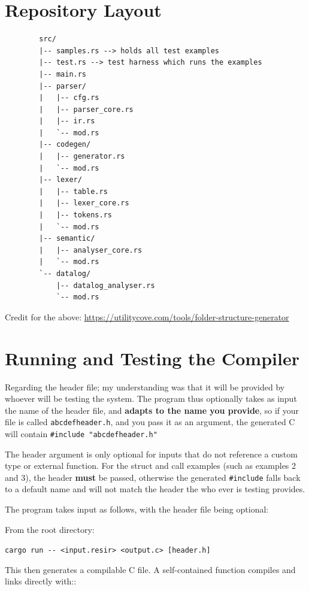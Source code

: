 \documentclass[11pt,a4paper,oneside]{report}
\begin{document}
	
	\section{Repository Layout}
	\begin{lstlisting}
		src/
		|-- samples.rs --> holds all test examples
		|-- test.rs --> test harness which runs the examples 
		|-- main.rs 
		|-- parser/
		|   |-- cfg.rs
		|   |-- parser_core.rs
		|   |-- ir.rs
		|   `-- mod.rs
		|-- codegen/
		|   |-- generator.rs
		|   `-- mod.rs
		|-- lexer/
		|   |-- table.rs
		|   |-- lexer_core.rs
		|   |-- tokens.rs
		|   `-- mod.rs
		|-- semantic/
		|   |-- analyser_core.rs
		|   `-- mod.rs
		`-- datalog/
			|-- datalog_analyser.rs
			`-- mod.rs
	\end{lstlisting}
	
	Credit for the above: \url{https://utilitycove.com/tools/folder-structure-generator}
	
	\section{Running and Testing the Compiler}
	\begin{designbox}
		Regarding the header file; my understanding was that it will be provided by whoever will be testing the system. The program thus optionally takes as input the name of the header file, and \textbf{adapts to the name you provide}, so if your file is called \texttt{abcdefheader.h}, and you pass it as an argument, the generated C will contain \texttt{\#include "abcdefheader.h"}
	\end{designbox}
	\begin{riskbox}
		The header argument is only optional for inputs that do not reference a custom
		type or external function. For the struct and call examples (such as examples 2
		and 3), the header \textbf{must} be passed, otherwise the generated
		\texttt{\#include} falls back to a default name and will not match the header
		the who ever is testing provides.
	\end{riskbox}
	The program takes input as follows, with the header file being optional:
	
	
	From the root directory:
		
	\begin{center}
		\texttt{cargo run -\-- <input.resir> <output.c> [header.h]}
	\end{center}
	
	This then generates a compilable C file. A self-contained function compiles and links directly with:: 
	
\end{document}
